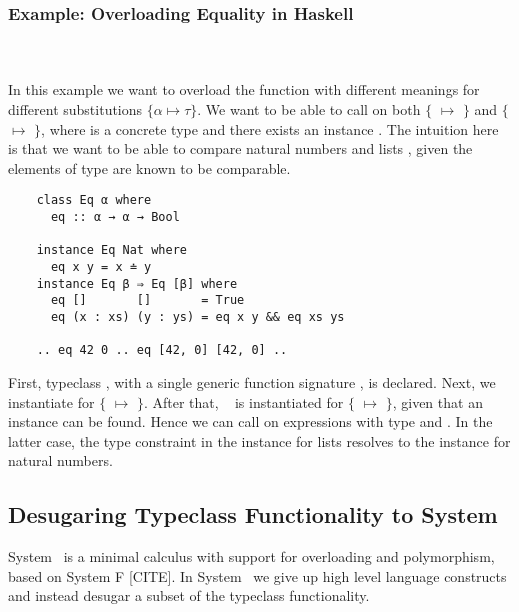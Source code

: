 \subsubsection{Example: Overloading Equality in Haskell}\hfill\\\\
In this example we want to overload the function  with different meanings for different substitutions $\{α \mapsto τ\}$.
We want to be able to call  on both $\{$ $\mapsto$ $\}$ and $\{$ $\mapsto$ \inl{[β]}$\}$, where  is a concrete type and there exists an instance . The intuition here is that we want to be able to compare natural numbers  and lists \mono{[β]}, given the elements of type  are known to be comparable.
\begin{verbatim}
    class Eq α where
      eq :: α → α → Bool 

    instance Eq Nat where
      eq x y = x ≐ y
    instance Eq β ⇒ Eq [β] where
      eq []       []       = True
      eq (x : xs) (y : ys) = eq x y && eq xs ys 

    .. eq 42 0 .. eq [42, 0] [42, 0] ..
\end{verbatim}
First, typeclass , with a single generic function signature , is declared. Next, we instantiate  for $\{$ $\mapsto$ $\}$. 
After that, \  is instantiated for $\{$ $\mapsto$ \inl{[β]}$\}$, given that an instance  can be found.
Hence we can call  on expressions with type  and \inl{[Nat]}. In the latter case, the type constraint  in the instance for lists resolves to the instance for natural numbers.

\subsection{Desugaring Typeclass Functionality to System \Fo}
System \Fo\ is a minimal calculus with support for overloading and polymorphism, based on System F [CITE].  
In System \Fo\ we give up high level language constructs and instead desugar a subset of the typeclass functionality. 

